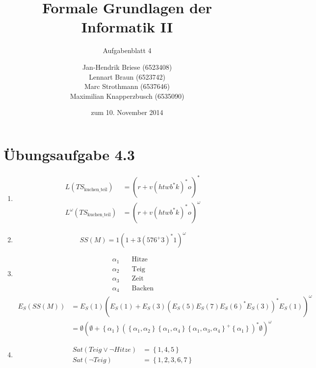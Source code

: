\documentclass[a4paper]{scrartcl}
\title{Formale Grundlagen der Informatik II}
\subtitle{Aufgabenblatt 4}
\author{
    Jan-Hendrik Briese (6523408) \\
    Lennart Braun (6523742) \\
    Marc Strothmann (6537646) \\
    Maximilian Knapperzbusch (6535090)
}
\date{zum 10. November 2014}
\begin{document}
\maketitle

\section*{Übungsaufgabe 4.3} 
\begin{enumerate}
    \item
        \begin{align*}
            L(TS_\text{kuchen\_teil}) &= \left( r + v \left( htwb^*k \right)^* o \right)^* \\
            L^\omega(TS_\text{kuchen\_teil}) &= \left( r + v \left( htwb^*k \right)^* o \right)^\omega
        \end{align*}

    \item
        \begin{equation*}
            SS(M) = 1 \left( 1 + 3 \left( 576^+3 \right)^* 1 \right)^\omega
        \end{equation*}

    \item
        \begin{align*}
            \alpha_1 &\quad \text{Hitze} \\
            \alpha_2 &\quad \text{Teig} \\
            \alpha_3 &\quad \text{Zeit} \\
            \alpha_4 &\quad \text{Backen}
        \end{align*}
        \begin{equation*}
            \begin{split}
                E_S(SS(M)) &= E_S(1) \left( E_S(1) + E_S(3) \left( E_S(5) E_S(7) E_S(6)^* E_S(3) \right)^* E_S(1) \right)^\omega \\
                &= \emptyset \left( \emptyset + \left\{ \alpha_1 \right\} \left( \left\{ \alpha_1, \alpha_2 \right\} \left\{ \alpha_1, \alpha_4 \right\} \left\{ \alpha_1, \alpha_3, \alpha_4 \right\}^+ \left\{ \alpha_1 \right\} \right)^* \emptyset \right)^\omega
            \end{split}
        \end{equation*}

    \item
        \begin{align}
            Sat(Teig \lor \lnot Hitze) &= \left\{ 1, 4, 5 \right\} \\
            Sat(\lnot Teig) &= \left\{ 1, 2, 3, 6, 7 \right\}
        \end{align}
        


\end{enumerate}
\end{document}
